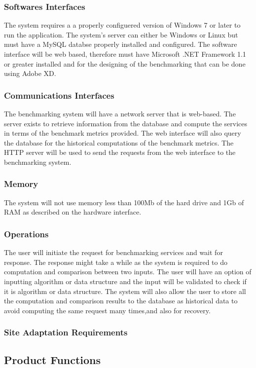 \documentclass[a4paper,12pt]{article}
\begin{document}
\subsubsection{Softwares Interfaces}
The system requires a a properly configuered version of Windows 7 or later to run the application. The system's server can either be Windows or Linux but must have a MySQL databse properly installed and configured. The software interface will be web based, therefore must have Microsoft .NET Framework 1.1 or greater installed and for the designing of the benchmarking that can be done using Adobe XD.

\subsubsection{Communications Interfaces}
The benchmarking system will have a network server that is web-based. The server exists to retrieve information from the database
and compute the services in terms of the benchmark metrics provided. The web interface will also query the database for the historical computations of the benchmark metrics. The HTTP server will be used to send the requests from the web interface to
the benchmarking system.
\subsubsection{Memory}
The system will not use memory less than 100Mb of the hard drive and 1Gb of RAM as described on the hardware interface.
\subsubsection{Operations}
The user will initiate the request for benchmarking services and wait for response. The response might take a while as the system is required to do computation and comparison between two inputs. The user will have an option of inputting algorithm or data structure and the input will be validated to check if it is algorithm or data structure. The system will also allow the user to store all the computation and comparison results to the database as historical data to avoid computing the same request many times,and also for recovery. 
\subsubsection{Site Adaptation Requirements}

\subsection{Product Functions}
\end{document}
